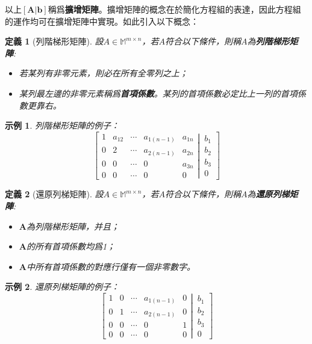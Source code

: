 \documentclass[12pt]{article}
\newtheorem{definition}{定義}
\newtheorem*{example}{示例}
\begin{document}
    以上$[\mathbf{A}|\mathbf{b}]$稱爲\textbf{擴增矩陣}。擴增矩陣的概念在於簡化方程組的表達，因此方程組的運作均可在擴增矩陣中實現。如此引入以下概念：

    \begin{definition}[列階梯形矩陣]
        設$A\in\mathbb{M}^{m\times n}$，若$A$符合以下條件，則稱$A$為\textbf{列階梯形矩陣}:\begin{itemize}
            \item 若某列有非零元素，則必在所有全零列之上；
            \item 某列最左邊的非零元素稱爲\textbf{首項係數}。某列的首項係數必定比上一列的首項係數更靠右。
        \end{itemize}
    \end{definition}

    \begin{example}
        列階梯形矩陣的例子：
        $$\left[
        \begin{matrix}
            1&a_{12}&\cdots&a_{1(n-1)}&a_{1n}\\
            0&2&\cdots&a_{2(n-1)}&a_{2n}\\
            0&0&\cdots&0&a_{3n}\\
            0&0&\cdots&0&0
        \end{matrix}
        \left|
          \,
          \begin{matrix}
            b_1\\b_2\\b_3\\0
          \end{matrix}
        \right.
      \right]$$
    \end{example}

    \begin{definition}[還原列梯矩陣]
        設$A\in\mathbb{M}^{m\times n}$，若$A$符合以下條件，則稱$A$為\textbf{還原列梯矩陣}:\begin{itemize}
            \item $\mathbf{A}$為列階梯形矩陣，并且；
            \item $\mathbf{A}$的所有首項係數均爲1；
            \item $\mathbf{A}$中所有首項係數的對應行僅有一個非零數字。
        \end{itemize}
    \end{definition}

    \begin{example}
        還原列梯矩陣的例子：
        $$\left[
        \begin{matrix}
            1&0&\cdots&a_{1(n-1)}&0\\
            0&1&\cdots&a_{2(n-1)}&0\\
            0&0&\cdots&0&1\\
            0&0&\cdots&0&0
        \end{matrix}
        \left|
          \,
          \begin{matrix}
            b_1\\b_2\\b_3\\0
          \end{matrix}
        \right.
      \right]$$
    \end{example}
\end{document}
